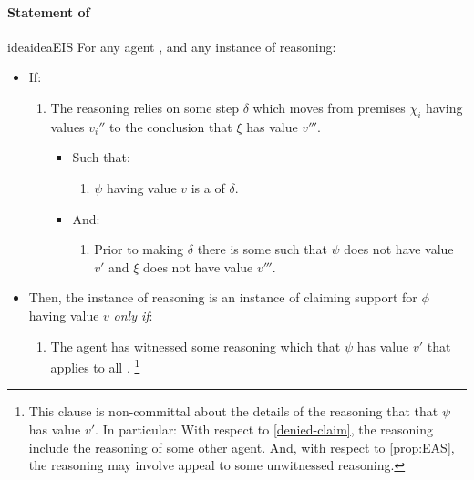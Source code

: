 \paragraph{Statement of \ideaCS{}}

\begin{note}
  \begin{restatable}{idea}{ideaEIS}
    \label{idea:CS:B}
    For any agent \vAgent{}, and any instance of reasoning:
    \begin{itemize}[leftmargin=*]
    \item
      If:
      \begin{enumerate}[label=\arabic*., ref=(\arabic*)]
      \item
        \label{idea:CS:B:step}
        The reasoning relies on some step \(\delta\) which moves from premises \(\chi_{i}\) having values \(v_{i}''\) to the conclusion that \(\xi\) has value \(v'''\).
        \begin{itemize}
        \item
          Such that:
          \begin{enumerate}[label=\alph*., ref=(\alph*)]
          \item
            \label{idea:CS:B:step:requ}
            \(\psi\) having value \(v\) is a \requ{} of \(\delta\).
          \end{enumerate}
        \item
          And:
          \begin{enumerate}[label=\alph*., ref=(\alph*), resume]
          \item
            \label{idea:CS:B:step:psi-ep}
            Prior to making \(\delta\) there is some \epPAd{} \world{} such that \(\psi\) does not have value \(v'\) and \(\xi\) does not have value \(v'''\).
          \end{enumerate}
        \end{itemize}
      \end{enumerate}
    \item
      Then, the instance of reasoning is an instance of claiming support for \(\phi\) having value \(v\) \emph{only if}:
      \begin{enumerate}[label=\arabic*., ref=(\arabic*), resume]
      \item
        \label{idea:CS:B:prior-reasoning}
        The agent has witnessed some reasoning which  that \(\psi\) has value \(v'\) that applies to all \epVAd{} .\nolinebreak
        \footnote{
          This clause is non-committal about the details of the reasoning that  that \(\psi\) has value \(v'\).
          In particular:
          With respect to \autoref{denied-claim}, the reasoning include the reasoning of some other agent.
          And, with respect to \autoref{prop:EAS}, the reasoning may involve appeal to some unwitnessed reasoning.
        }
      \end{enumerate}
    \end{itemize}
    \vspace{-\baselineskip}
  \end{restatable}
\end{note}

